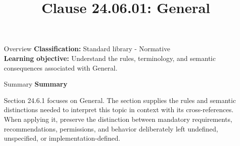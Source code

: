 \documentclass[10pt,letterpaper]{article}
\title{Clause 24.06.01: General}
\author{}
\date{}
\begin{document}
\maketitle
\begin{CornellOverviewBox}{Overview}
\textbf{Classification:} Standard library - Normative\\[2pt]
\textbf{Learning objective:} Understand the rules, terminology, and semantic consequences associated with General.
\end{CornellOverviewBox}\begin{CornellSummaryBox}{Summary}
{\sffamily\bfseries\color{Accent} Summary}\par\vspace{3pt}Section 24.6.1 focuses on General. The section supplies the rules and semantic distinctions needed to interpret this topic in context with its cross-references. When applying it, preserve the distinction between mandatory requirements, recommendations, permissions, and behavior deliberately left undefined, unspecified, or implementation-defined.
\end{CornellSummaryBox}
\end{document}
